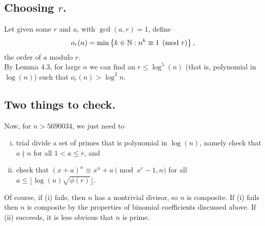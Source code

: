 \documentclass{article}
\begin{document}
\subsection{Choosing $r$.}
Let given some $r$ and $a$, with $\gcd(a, r) = 1$, define \[
  o_r(n) = \min\left\{ k \in \mathbb N : n^k \equiv 1 \pmod r \right\},
\] the order of $a$ modulo $r$.
\\
By Lemma 4.3, for large $n$ we can find an $r \leq \log^5(n)$
(that is, polynomial in $\log(n)$) such that $o_r(n) > \log^2 n$.

\subsection{Two things to check.}
Now, for $n > 5690034$, we just need to \begin{enumerate}[(i)]
  \item trial divide a set of primes that is polynomial in $\log(n)$, namely check that $a \nmid n$ for all $1 < a \leq r$, and
  \item check that $(x + a)^{n} \equiv x^n + a \pmod{x^r-1, n}$ for all
    $a \leq \lfloor\log(n)\sqrt{\phi(r)}\rfloor$.
\end{enumerate}
Of course,
if (i) fails, then $n$ has a nontrivial divisor, so $n$ is composite.
If (i) fails then $n$ is composite by the properties of binomial coefficients
discussed above.
If (ii) succeeds, it is less obvious that $n$ is prime.
\end{document}
